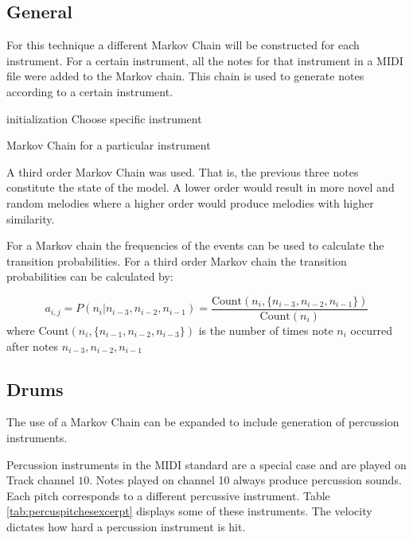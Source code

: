 \subsection{General}
For this technique a different Markov Chain will be constructed for each instrument. 
For a certain instrument, all the notes for that instrument in a MIDI file were added to the Markov chain. This chain is used to generate notes according to a certain instrument.
\begin{algorithm}
 initialization\;
 Choose specific instrument\;
 \caption{Markov Chain for a particular instrument}
 \label{algo:instrumm}
\end{algorithm}

A third order Markov Chain was used. That is, the previous three notes constitute the state of the model. A lower order would result in more novel and random melodies where a higher order would produce melodies with higher similarity. 

For a Markov chain the frequencies of the events can be used to calculate the transition probabilities. For a third order Markov chain the transition probabilities can be calculated by:

\[ a_{i,j} = P(n_i|n_{i-3},n_{i-2},n_{i-1}) = \frac{\text{Count}(n_i, \{ n_{i-3},n_{i-2},n_{i-1} \} )}{\text{Count}(n_i)} \]
where $\text{Count}(n_i, \{ n_{i-1},n_{i-2},n_{i-3} \} )$ is the number of times note $n_i$ occurred after notes $n_{i-3}, n_{i-2}, n_{i-1}$


\subsection{Drums}
The use of a Markov Chain can be expanded to include generation of percussion instruments. 

Percussion instruments in the MIDI standard are a special case and are played on Track channel $10$. Notes played on channel 10 always produce percussion sounds. Each pitch corresponds to a different percussive instrument. Table \ref{tab:percuspitchesexcerpt} displays some of these instruments. The velocity dictates how hard a percussion instrument is hit.


